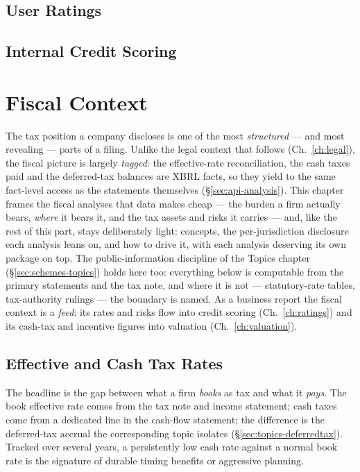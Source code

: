 \documentclass[11pt,a4paper]{report}
\begin{document}
\section{User Ratings}
\section{Internal Credit Scoring}

\chapter{Fiscal Context}
\label{ch:fiscal}

The tax position a company discloses is one of the most \emph{structured} --- and most revealing --- parts of a
filing. Unlike the legal context that follows (Ch.~\ref{ch:legal}), the fiscal picture is largely \emph{tagged}:
the effective-rate reconciliation, the cash taxes paid and the deferred-tax balances are XBRL facts, so they
yield to the same fact-level access as the statements themselves (\S\ref{sec:api-analysis}). This chapter
frames the fiscal analyses that data makes cheap --- the burden a firm actually bears, \emph{where} it bears it,
and the tax assets and risks it carries --- and, like the rest of this part, stays deliberately light: concepts,
the per-jurisdiction disclosure each analysis leans on, and how to drive it, with each analysis deserving its
own package on top. The public-information discipline of the Topics chapter (\S\ref{sec:schemes-topics}) holds
here too: everything below is computable from the primary statements and the tax note, and where it is not ---
statutory-rate tables, tax-authority rulings --- the boundary is named. As a business report the fiscal context
is a \emph{feed}: its rates and risks flow into credit scoring (Ch.~\ref{ch:ratings}) and its cash-tax and
incentive figures into valuation (Ch.~\ref{ch:valuation}).

\section{Effective and Cash Tax Rates}
The headline is the gap between what a firm \emph{books} as tax and what it \emph{pays}. The book effective rate
comes from the tax note and income statement; cash taxes come from a dedicated line in the cash-flow statement;
the difference is the deferred-tax accrual the corresponding topic isolates (\S\ref{sec:topics-deferredtax}).
Tracked over several years, a persistently low cash rate against a normal book rate is the signature of durable
timing benefits or aggressive planning.
\end{document}
